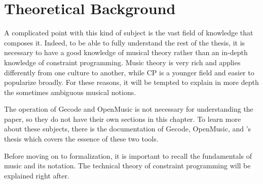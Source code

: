 \chapter{Theoretical Background}
A complicated point with this kind of subject is the vast field of knowledge that composes it. Indeed, to be able to fully understand the rest of the thesis, it is necessary to have a good knowledge of musical theory rather than an in-depth knowledge of constraint programming. Music theory is very rich and applies differently from one culture to another, while CP is a younger field and easier to popularize broadly. For these reasons, it will be tempted to explain in more depth the sometimes ambiguous musical notions. 

The operation of Gecode and OpenMusic is not necessary for understanding the paper, so they do not have their own sections in this chapter. To learn more about these subjects, there is the documentation of Gecode\parencite{GecodeManual}, OpenMusic\parencite{OpenMusicDoc}, and \textcite{Melothesis}'s thesis which covers the essence of these two tools.

Before moving on to formalization, it is important to recall the fundamentals of music and its notation. The technical theory of constraint programming will be explained right after.

